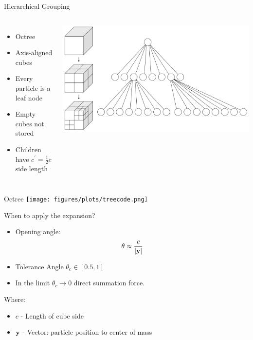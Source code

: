 \begin{frame}{Hierarchical Grouping}
	\begin{columns}
		\begin{itemize}
			\item Octree
			\item Axis-aligned cubes
			\item Every particle is a leaf node
			\item Empty cubes not stored
			\item Children have $c^\prime = \frac{1}{2}c$ side length
		\end{itemize}
		\includegraphics[width=\linewidth]{figures/cube.png}
	\end{columns}
\end{frame}

\begin{frame}[plain]{Octree}
	\texttt{[image: figures/plots/treecode.png]}
\end{frame}

\begin{frame}{When to apply the expansion?}
	\begin{itemize}
		\item Opening angle:
		      \begin{equation}
			      \theta \approx \frac{c}{|\vb{y}|}
		      \end{equation}
		\item Tolerance Angle $\theta_c \in [0.5, 1]$
		\item In the limit $\theta_c \rightarrow 0$  direct summation force.
	\end{itemize}\bigskip

	{\footnotesize
		Where:
		\begin{itemize}
			\item $c$ - Length of cube side
			\item $\vb{y}$ - Vector: particle position to center of mass
		\end{itemize}
	}
\end{frame}

